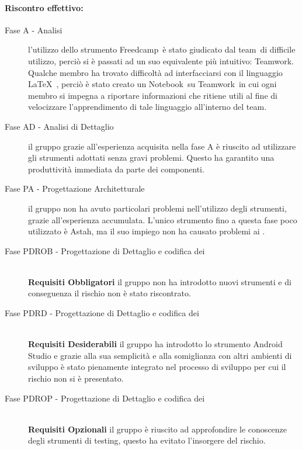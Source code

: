 \documentclass[../PianoProgetto.tex]{subfiles}
\begin{document}
	\paragraph*{Riscontro effettivo:} 
		\begin{description}
			\item[Fase A - Analisi] l'utilizzo dello strumento Freedcamp\g\ è stato giudicato dal team\g\ di difficile utilizzo, perciò si è passati ad un suo equivalente più intuitivo: Teamwork\g .
	Qualche membro ha trovato difficoltà ad interfacciarsi con il linguaggio \LaTeX\  , perciò è stato creato un Notebook\g\ su Teamwork\g\ in cui ogni membro si impegna a riportare informazioni che ritiene utili al fine di velocizzare l'apprendimento di tale linguaggio all'interno del team\g .
			\item[Fase AD - Analisi di Dettaglio] il gruppo grazie all'esperienza acquisita nella fase A è riuscito ad utilizzare gli strumenti adottati senza gravi problemi. Questo ha garantito una produttività immediata da parte dei componenti. 
			\item[Fase PA - Progettazione Architetturale] il gruppo non ha avuto particolari problemi nell'utilizzo degli strumenti, grazie all'esperienza accumulata. L'unico strumento fino a questa fase poco utilizzato è Astah\g, ma il suo impiego non ha causato problemi ai \progettisti.
			\item[Fase PDROB - Progettazione di Dettaglio e codifica dei] \ \\
			\textbf{Requisiti Obbligatori} il gruppo non ha introdotto nuovi strumenti e di conseguenza il rischio non è stato riscontrato. 
					 
			\item[Fase PDRD - Progettazione di Dettaglio e codifica dei] \ \\
					\textbf{Requisiti Desiderabili} il gruppo ha introdotto lo strumento Android Studio e grazie alla sua semplicità e alla somiglianza con altri ambienti di sviluppo è stato pienamente integrato nel processo di sviluppo per cui il rischio non si è presentato.
			\item[Fase PDROP - Progettazione di Dettaglio e codifica dei]  \ \\
					\textbf{Requisiti Opzionali} il gruppo è riuscito ad approfondire le conoscenze degli strumenti di testing, questo ha evitato l'insorgere del rischio.
		\end{description}
		
\end{document}
